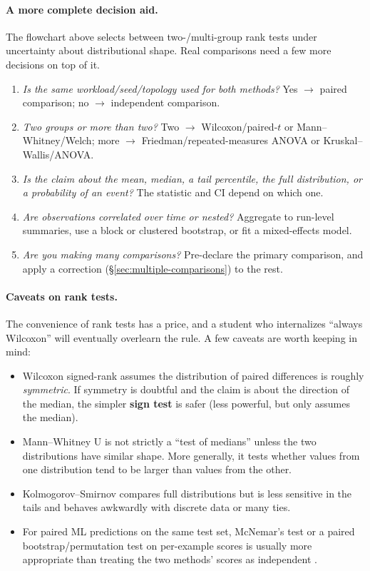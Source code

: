 \documentclass[11pt]{article}
\begin{document}
\paragraph{A more complete decision aid.} The flowchart above selects between two-/multi-group rank tests under uncertainty about distributional shape. Real comparisons need a few more decisions on top of it.

\begin{enumerate}[leftmargin=*, itemsep=1pt]
    \item \emph{Is the same workload/seed/topology used for both methods?} Yes $\to$ paired comparison; no $\to$ independent comparison.
    \item \emph{Two groups or more than two?} Two $\to$ Wilcoxon/paired-$t$ or Mann--Whitney/Welch; more $\to$ Friedman/repeated-measures ANOVA or Kruskal--Wallis/ANOVA.
    \item \emph{Is the claim about the mean, median, a tail percentile, the full distribution, or a probability of an event?} The statistic and CI depend on which one.
    \item \emph{Are observations correlated over time or nested?} Aggregate to run-level summaries, use a block or clustered bootstrap, or fit a mixed-effects model.
    \item \emph{Are you making many comparisons?} Pre-declare the primary comparison, and apply a correction (\S\ref{sec:multiple-comparisons}) to the rest.
\end{enumerate}

\paragraph{Caveats on rank tests.} The convenience of rank tests has a price, and a student who internalizes ``always Wilcoxon'' will eventually overlearn the rule. A few caveats are worth keeping in mind:

\begin{itemize}[leftmargin=*, itemsep=1pt]
    \item Wilcoxon signed-rank assumes the distribution of paired differences is roughly \emph{symmetric}. If symmetry is doubtful and the claim is about the direction of the median, the simpler \textbf{sign test} is safer (less powerful, but only assumes the median).
    \item Mann--Whitney U is not strictly a ``test of medians'' unless the two distributions have similar shape. More generally, it tests whether values from one distribution tend to be larger than values from the other.
    \item Kolmogorov--Smirnov compares full distributions but is less sensitive in the tails and behaves awkwardly with discrete data or many ties.
    \item For paired ML predictions on the same test set, McNemar's test or a paired bootstrap/permutation test on per-example scores is usually more appropriate than treating the two methods' scores as independent \citep{dietterich1998approximate}.
\end{itemize}
\end{document}

